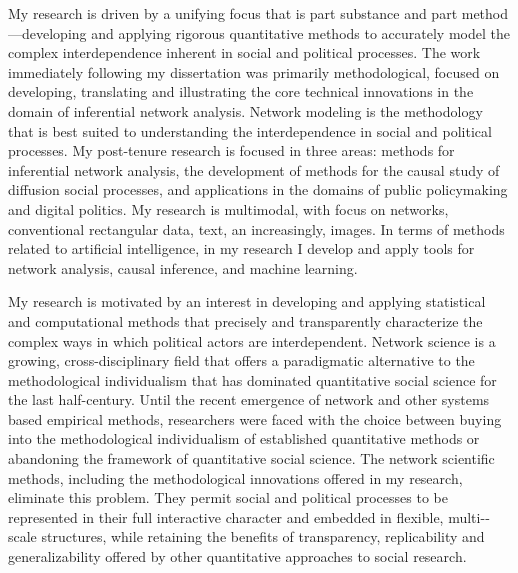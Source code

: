 \documentclass[a4paper]{article}
\begin{document}
 
\pagestyle{fancy}

\vspace*{-.8cm}

My research is driven by a unifying focus that is part substance and part method---developing and applying rigorous quantitative methods to accurately model the complex interdependence inherent in social and political processes. The work immediately following my dissertation was primarily methodological, focused on developing, translating and illustrating the core technical innovations in the domain of inferential network analysis. Network modeling is the methodology that is best suited to understanding the interdependence in social and political processes. My post-tenure research is focused in three areas: methods for inferential network analysis, the development of methods for the causal study of diffusion social processes, and applications in the domains of public policymaking and digital politics. My research is multimodal, with focus on networks, conventional rectangular data, text, an increasingly, images. In terms of methods related to artificial intelligence, in my research I develop and apply tools for network analysis, causal inference, and machine learning. 


My research is motivated by an interest in developing and applying statistical and computational methods that precisely and transparently characterize the complex ways in which political actors are interdependent. Network science is a growing, cross-­disciplinary field that offers a paradigmatic alternative to the methodological individualism that has dominated quantitative social science for the last half-­century. Until the recent emergence of network and other systems based empirical methods, researchers were faced with the choice between buying into the methodological individualism of established quantitative methods or abandoning the framework of quantitative social science. The network scientific methods, including the methodological innovations offered in my research, eliminate this problem. They permit social and political processes to be represented in their full interactive character and embedded in flexible, multi-­scale structures, while retaining the benefits of transparency, replicability and generalizability offered by other quantitative approaches to social research.
\end{document}
